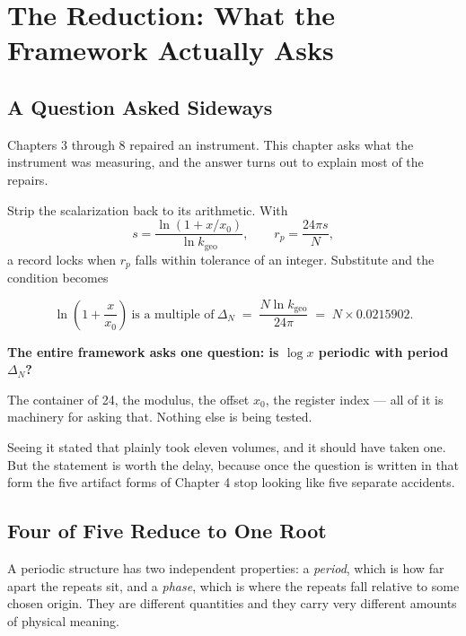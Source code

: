 \documentclass[11pt, letterpaper, openany]{book}
\newcommand{\kgeo}{k_{\mathrm{geo}}}
\begin{document}
\chapter{The Reduction: What the Framework Actually Asks}

\section{A Question Asked Sideways}

Chapters 3 through 8 repaired an instrument. This chapter asks what the instrument was
measuring, and the answer turns out to explain most of the repairs.

Strip the scalarization back to its arithmetic. With
\[
s = \frac{\ln\!\left(1 + x/x_0\right)}{\ln \kgeo}, \qquad r_p = \frac{24\pi s}{N},
\]
a record locks when $r_p$ falls within tolerance of an integer. Substitute and the condition
becomes

\begin{equation}
\ln\!\left(1 + \frac{x}{x_0}\right) \ \text{is a multiple of} \
\Delta_N \;=\; \frac{N \ln \kgeo}{24\pi} \;=\; N \times 0.0215902 .
\label{eq:deltaN}
\end{equation}

\begin{signalbox}
\textbf{The entire framework asks one question: is $\log x$ periodic with period $\Delta_N$?}

\medskip
\noindent The container of 24, the modulus, the offset $x_0$, the register index --- all of it
is machinery for asking that. Nothing else is being tested.
\end{signalbox}

Seeing it stated that plainly took eleven volumes, and it should have taken one. But the
statement is worth the delay, because once the question is written in that form the five
artifact forms of Chapter 4 stop looking like five separate accidents.

\section{Four of Five Reduce to One Root}

A periodic structure has two independent properties: a \emph{period}, which is how far apart
the repeats sit, and a \emph{phase}, which is where the repeats fall relative to some chosen
origin. They are different quantities and they carry very different amounts of physical
meaning.
\end{document}
